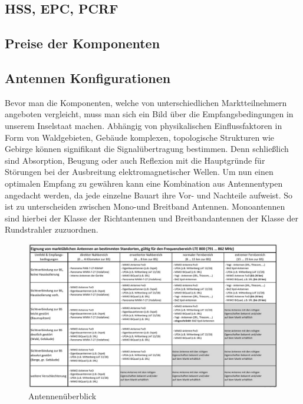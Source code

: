	\subsection{HSS, EPC, PCRF}
	\label{subsec:Antennen HSS, EPC, PCRF}
		\subsection{Preise der Komponenten}
	\label{subsec:Preise der Komponenten}
	\subsection{Antennen Konfigurationen}
	\label{subsec:Antennen Konfigurationen}
Bevor man die Komponenten, welche von unterschiedlichen Marktteilnehmern angeboten vergleicht, muss man sich ein Bild über die Empfangsbedingungen in unserem Inselstaat machen. Abhängig von physikalischen Einflussfaktoren in Form von Waldgebieten, Gebäude komplexen, topologische Strukturen wie Gebirge können signifikant die Signalübertragung bestimmen. Denn schließlich sind Absorption, Beugung oder auch Reflexion mit die Hauptgründe für Störungen bei der Ausbreitung elektromagnetischer Wellen. Um nun einen optimalen Empfang zu gewähren kann eine Kombination aus Antennentypen angedacht werden, da jede einzelne Bauart ihre Vor- und Nachteile aufweist. So ist zu unterscheiden zwischen Mono-und Breitband Antennen. Monoantennen sind hierbei der Klasse der Richtantennen und Breitbandantennen der Klasse der Rundstrahler zuzuordnen. \cite{Sch19}
\begin{figure}[H]
	\centering
	\includegraphics[width=1\linewidth]{images/tabellemcnantennen}
	\caption{Antennenüberblick  \protect\cite{Sch19}}
	\label{fig:tabellemcnantennen}
\end{figure}
\raggedbottom 
